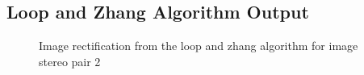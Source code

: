 \documentclass{article}
\begin{document}
\subsection{Loop and Zhang Algorithm Output}
\begin{figure}[!htbp]
     \centering
     \captionsetup[subfigure]{labelformat=empty}
    \caption{Image rectification from the loop and zhang algorithm for image stereo pair 2}
    \label{fig:lZ_2}
\end{figure}
\end{document}
